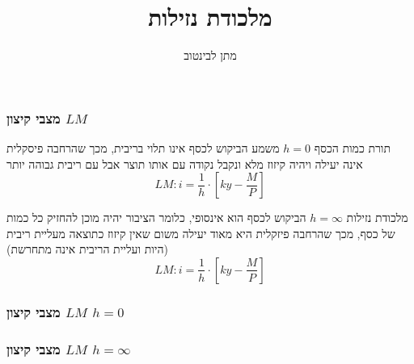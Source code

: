 \documentclass[usenames,dvipsnames]{beamer}
\title[]{{מלכודת נזילות}}
\author{{ מתן לבינטוב}}
\institute[{{ אב"ג}}]{{ אוניברסיטת בן גוריון בנגב}}
\date{}
\begin{document}
\begin{RTL}
\begin{frame}
\titlepage
\end{frame}

\begin{frame}
    \frametitle{מצבי קיצון $LM$}
    \begin{block}{תורת כמות הכסף $h=0$}
        משמע הביקוש לכסף אינו תלוי בריבית, מכך שהרחבה פיסקלית אינה יעילה ויהיה קיזוז מלא ונקבל נקודה  עם אותו תוצר אבל עם ריבית גבוהה יותר
        $$LM : i = \frac{1}{h} \cdot \left[ky - \frac{M}{P}\right]$$
    \end{block}

    \begin{block}{מלכודת נזילות $h=\infty$}
        הביקוש לכסף הוא אינסופי, כלומר הציבור יהיה מוכן להחזיק כל כמות של כסף, מכך שהרחבה פיזקלית היא מאוד יעילה משום שאין קיזוז כתוצאה מעליית ריבית (היות ועליית הריבית אינה מתחרשת)
        $$LM : i = \frac{1}{h} \cdot \left[ky - \frac{M}{P}\right]$$   
    \end{block}
\end{frame}

\begin{frame}
    \frametitle{מצבי קיצון $LM$ $h=0$}

    \begin{center}
    \end{center}
\end{frame}

\begin{frame}
    \frametitle{מצבי קיצון $LM$ $h=\infty$}

    \begin{center}
\end{center}
\end{frame}
\end{RTL}
\end{document}
